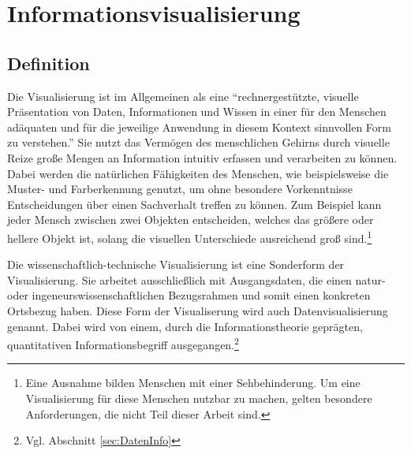 \documentclass[a4paper, 
               12pt,
               DIV=calc,
               version=first,
               pdftex,
               headsepline,
               footsepline,
               bibtotocnumbered,
               liststotocnumbered]{scrreprt}
\begin{document}
\chapter{Informationsvisualisierung}
\label{cha:Informationsvisualisierung}
\section{Definition}
\label{sec:Definition}
Die Visualisierung ist im Allgemeinen als eine "`rechnergestützte, visuelle Präsentation von Daten, Informationen und Wissen
in einer für den Menschen adäquaten und für die jeweilige Anwendung in diesem Kontext sinnvollen Form
zu verstehen."'\citep[S.\,3]{Schumann}
Sie nutzt das Vermögen des menschlichen Gehirns durch visuelle Reize große Mengen an Information
intuitiv erfassen und verarbeiten zu können. Dabei werden die natürlichen Fähigkeiten des Menschen,
wie beispielsweise die Muster- und Farberkennung genutzt, um ohne besondere Vorkenntnisse Entscheidungen über
einen Sachverhalt treffen zu können. Zum Beispiel kann jeder Mensch zwischen zwei Objekten entscheiden,
welches das größere oder hellere Objekt ist, solang die visuellen Unterschiede ausreichend groß sind.\footnote{
Eine Ausnahme bilden Menschen mit einer Sehbehinderung. Um eine Visualisierung für diese Menschen
nutzbar zu machen, gelten besondere Anforderungen, die nicht Teil dieser Arbeit sind.}

Die wissenschaftlich-technische Visualisierung ist eine Sonderform der Visualisierung. Sie arbeitet ausschließlich mit Ausgangsdaten,
die einen natur- oder ingeneurswissenschaftlichen Bezugsrahmen und somit einen konkreten Ortsbezug haben. Diese Form der
Visualiserung wird auch Datenvisualisierung genannt. Dabei wird von einem, durch die Informationstheorie
geprägten, quantitativen Informationsbegriff ausgegangen.\footnote{Vgl. 
Abschnitt \ref{sec:DatenInfo}}
\end{document}

